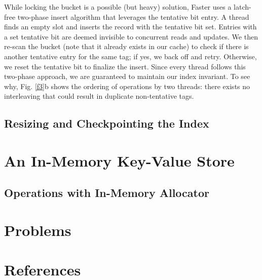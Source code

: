 \documentclass[11pt]{article}
\begin{document}
While locking the bucket is a possible (but heavy) solution, Faster uses a latch-free two-phase insert
algorithm that leverages the tentative bit entry. A thread finds an empty slot and inserts the record
with the tentative bit set. Entries with a set tentative bit are deemed invisible to concurrent reads
and updates. We then re-scan the bucket (note that it already exists in our cache) to check if there
is another tentative entry for the same tag; if yes, we back off and retry. Otherwise, we reset the
tentative bit to finalize the insert. Since every thread follows this two-phase approach, we are
guaranteed to maintain our index invariant. To see why, Fig. \ref{f3}b shows the ordering of operations
by  two threads: there exists no interleaving that could result in duplicate non-tentative tags.

\subsection{Resizing and Checkpointing the Index}
\label{sec:org005a54c}
\section{An In-Memory Key-Value Store}
\label{sec:orgbf3efe4}
\subsection{Operations with In-Memory Allocator}
\label{sec:org221310e}
\section{Problems}
\label{sec:orgc83764a}


\section{References}
\label{sec:org9d0ff30}
\label{bibliographystyle link}



\end{document}
